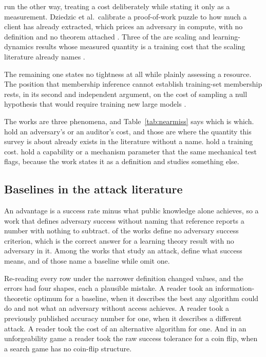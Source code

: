 \NearMissB{} run the other way, treating a cost deliberately while stating it
only as a measurement. Dziedzic et al.\ calibrate a proof-of-work puzzle to
how much a client has already extracted, which prices an adversary in compute,
with no definition and no theorem attached \cite{DKLP22}. Three of the
\NearMissB{} are scaling and learning-dynamics results whose measured quantity
is a training cost that the scaling literature already names
\cite{SGSGM22,BAP25,BEGKMZ22}.

The remaining one states no tightness at all while plainly assessing a
resource. The position that membership inference cannot establish training-set
membership rests, in its second and independent argument, on the cost of
sampling a null hypothesis that would require training new large models
\cite{ZDKT25}.

The \NearMiss{} works are three phenomena, and Table~\ref{tab:nearmiss} says
which is which. \NearMissAdv{} hold an adversary's or an auditor's cost, and
those are where the quantity this survey is about already exists in the
literature without a name. \NearMissTrain{} hold a training cost.
\NearMissCap{} hold a capability or a mechanism parameter that the same
mechanical test flags, because the work states it as a definition and studies
something else.

\subsection{Baselines in the attack literature}

An advantage is a success rate minus what public knowledge alone achieves, so
a work that defines adversary success without naming that reference reports a
number with nothing to subtract. \BaselineNA{} of the \NumSources{} works
define no adversary success criterion, which is the correct answer for a
learning theory result with no adversary in it. Among the \NumAttackWorks{}
works that study an attack, \BaselineCrit{} define what success means, and of
those
\BaselineStated{} name a baseline while \BaselineAbsent{} omit one.

Re-reading every row under the narrower definition changed \BaselineChanged{}
values, and the errors had four shapes, each a plausible mistake. A reader
took an information-theoretic optimum for a baseline, when it describes the
best any algorithm could do and not what an adversary without access achieves.
A reader took a previously published accuracy number for one, when it
describes a different attack. A reader took the cost of an alternative
algorithm for one. And in an unforgeability game a reader took the raw success
tolerance for a coin flip, when a search game has no coin-flip structure.
